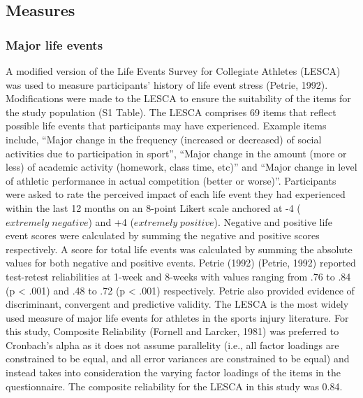 \documentclass[utf8]{frontiersHLTH}
\begin{document}
\hypertarget{measures}{%
\subsection*{Measures}\label{measures}}

\hypertarget{major-life-events}{%
\subsubsection*{Major life events}\label{major-life-events}}

A modified version of the Life Events Survey for Collegiate Athletes
(LESCA) was used to measure participants' history of life event stress
(Petrie, 1992). Modifications were made to the LESCA to ensure the
suitability of the items for the study population (S1 Table). The LESCA
comprises 69 items that reflect possible life events that participants
may have experienced. Example items include, ``Major change in the
frequency (increased or decreased) of social activities due to
participation in sport'', ``Major change in the amount (more or less) of
academic activity (homework, class time, etc)'' and ``Major change in
level of athletic performance in actual competition (better or worse)''.
Participants were asked to rate the perceived impact of each life event
they had experienced within the last 12 months on an 8-point Likert
scale anchored at -4 (\(extremely\;negative\)) and +4
(\(extremely\;positive\)). Negative and positive life event scores were
calculated by summing the negative and positive scores respectively. A
score for total life events was calculated by summing the absolute
values for both negative and positive events. Petrie (1992) (Petrie,
1992) reported test-retest reliabilities at 1-week and 8-weeks with
values ranging from .76 to .84 (p \textless{} .001) and .48 to .72 (p
\textless{} .001) respectively. Petrie also provided evidence of
discriminant, convergent and predictive validity. The LESCA is the most
widely used measure of major life events for athletes in the sports
injury literature. For this study, Composite Reliability (Fornell and
Larcker, 1981) was preferred to Cronbach's alpha as it does not assume
parallelity (i.e., all factor loadings are constrained to be equal, and
all error variances are constrained to be equal) and instead takes into
consideration the varying factor loadings of the items in the
questionnaire. The composite reliability for the LESCA in this study was
0.84.
\end{document}
